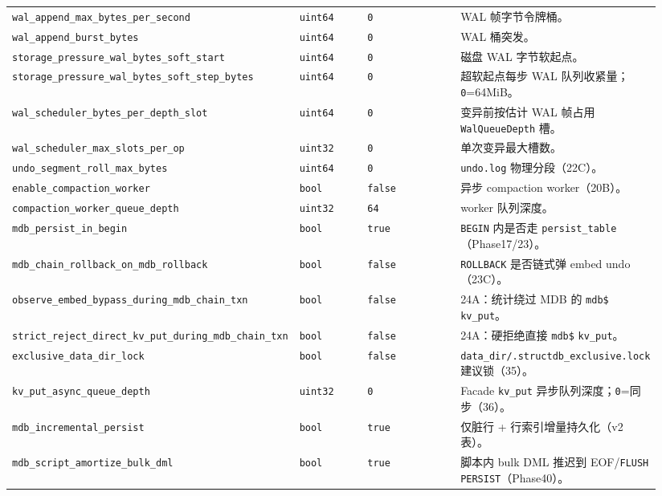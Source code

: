 {\begin{longtable}{@{}p{0.34\linewidth}p{0.12\linewidth}p{0.18\linewidth}p{0.30\linewidth}@{}}
\texttt{wal\_append\_max\_bytes\_per\_second} & \texttt{uint64} & \texttt{0} & WAL 帧字节令牌桶。 \\
\texttt{wal\_append\_burst\_bytes} & \texttt{uint64} & \texttt{0} & WAL 桶突发。 \\
\texttt{storage\_pressure\_wal\_bytes\_soft\_start} & \texttt{uint64} & \texttt{0} & 磁盘 WAL 字节软起点。 \\
\texttt{storage\_pressure\_wal\_bytes\_soft\_step\_bytes} & \texttt{uint64} & \texttt{0} & 超软起点每步 WAL 队列收紧量；\texttt{0}=64MiB。 \\
\texttt{wal\_scheduler\_bytes\_per\_depth\_slot} & \texttt{uint64} & \texttt{0} & 变异前按估计 WAL 帧占用 \texttt{WalQueueDepth} 槽。 \\
\texttt{wal\_scheduler\_max\_slots\_per\_op} & \texttt{uint32} & \texttt{0} & 单次变异最大槽数。 \\
\texttt{undo\_segment\_roll\_max\_bytes} & \texttt{uint64} & \texttt{0} & \texttt{undo.log} 物理分段（22C）。 \\
\texttt{enable\_compaction\_worker} & \texttt{bool} & \texttt{false} & 异步 compaction worker（20B）。 \\
\texttt{compaction\_worker\_queue\_depth} & \texttt{uint32} & \texttt{64} & worker 队列深度。 \\
\texttt{mdb\_persist\_in\_begin} & \texttt{bool} & \texttt{true} & \texttt{BEGIN} 内是否走 \texttt{persist\_table}（Phase17/23）。 \\
\texttt{mdb\_chain\_rollback\_on\_mdb\_rollback} & \texttt{bool} & \texttt{false} & \texttt{ROLLBACK} 是否链式弹 embed undo（23C）。 \\
\texttt{observe\_embed\_bypass\_during\_mdb\_chain\_txn} & \texttt{bool} & \texttt{false} & 24A：统计绕过 MDB 的 \texttt{mdb\$} \texttt{kv\_put}。 \\
\texttt{strict\_reject\_direct\_kv\_put\_during\_mdb\_chain\_txn} & \texttt{bool} & \texttt{false} & 24A：硬拒绝直接 \texttt{mdb\$} \texttt{kv\_put}。 \\
\texttt{exclusive\_data\_dir\_lock} & \texttt{bool} & \texttt{false} & \texttt{data\_dir/.structdb\_exclusive.lock} 建议锁（35）。 \\
\texttt{kv\_put\_async\_queue\_depth} & \texttt{uint32} & \texttt{0} & Facade \texttt{kv\_put} 异步队列深度；\texttt{0}=同步（36）。 \\
\texttt{mdb\_incremental\_persist} & \texttt{bool} & \texttt{true} & 仅脏行 + 行索引增量持久化（v2 表）。 \\
\texttt{mdb\_script\_amortize\_bulk\_dml} & \texttt{bool} & \texttt{true} & 脚本内 bulk DML 推迟到 EOF/\texttt{FLUSH PERSIST}（Phase40）。 \\

\end{longtable}}
